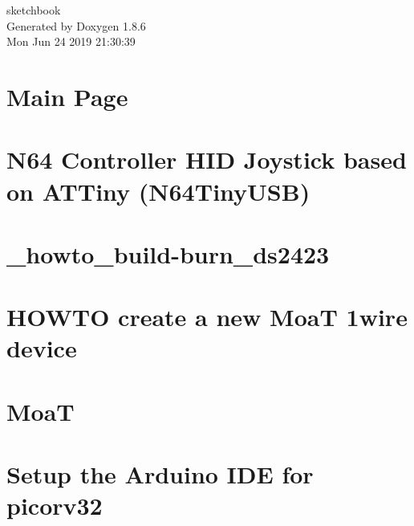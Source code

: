 \documentclass[twoside]{book}
\newcommand{\clearemptydoublepage}{%
  \newpage{\pagestyle{empty}\cleardoublepage}%
}
\begin{document}
\hypersetup{pageanchor=false}
\begin{titlepage}
\vspace*{7cm}
\begin{center}%
{\Large sketchbook }\\
\vspace*{1cm}
{\large Generated by Doxygen 1.8.6}\\
\vspace*{0.5cm}
{\small Mon Jun 24 2019 21:30:39}\\
\end{center}
\end{titlepage}
\clearemptydoublepage
\tableofcontents
\clearemptydoublepage
{}
\hypersetup{pageanchor=true}

\chapter{Main Page}
\label{index}\hypertarget{index}{}
\chapter{N64 Controller H\-I\-D Joystick based on A\-T\-Tiny (N64\-Tiny\-U\-S\-B)}
\label{md_cli_n64dual_tiny45_README}
\hypertarget{md_cli_n64dual_tiny45_README}{}

\chapter{\-\_\-howto\-\_\-build-\/burn\-\_\-ds2423}
\label{md_cli_owslave__howto_build-burn_ds2423}
\hypertarget{md_cli_owslave__howto_build-burn_ds2423}{}

\chapter{H\-O\-W\-T\-O create a new Moa\-T 1wire device}
\label{md_cli_owslave_HOWTO}
\hypertarget{md_cli_owslave_HOWTO}{}

\chapter{Moa\-T}
\label{md_cli_owslave_README}
\hypertarget{md_cli_owslave_README}{}

\chapter{Setup the Arduino I\-D\-E for picorv32}
\label{md_hardware_README}
\hypertarget{md_hardware_README}{}

\end{document}
